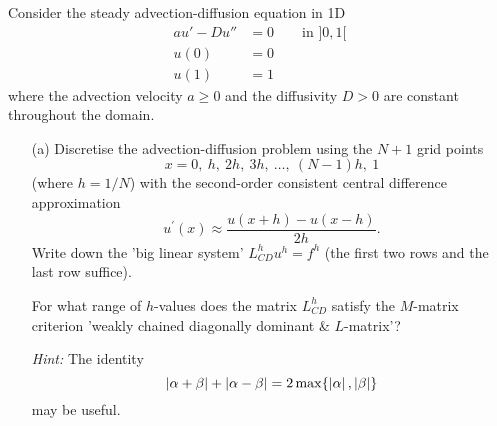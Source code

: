 




\begin{titlingpage}
	\titleGM
\end{titlingpage}
\clearpage
\setcounter{page}{1}

\begin{problem}{1}
Consider the steady advection-diffusion equation in 1D
%
\begin{align*}
    a u' - D u'' &= 0 \qquad
    \text{in } ]0,1[\\
    u(0) &= 0 \\
    u(1) &= 1
\end{align*}
%
where the advection velocity $a \ge 0$ and the diffusivity 
$D>0$ are constant throughout the domain.

\begin{itemize}
	\item[(a)] Discretise the advection-diffusion problem
	using the $N+1$ grid points
	$$x=0,\:h,\:2h,\:3h,\:\ldots,\:(N-1)h,\:1$$
	(where $h=1/N$) with the second-order consistent central 
	difference approximation
	$$u^\prime(x)\approx\frac{u(x+h)-u(x-h)}{2h}.$$
	Write down the 'big linear system' $L^h_{CD}u^h=f^h$
	(the first two rows and the last row suffice).
	
	For what range of $h$-values does the matrix $L^h_{CD}$
	satisfy the $M$-matrix criterion 'weakly chained
	diagonally dominant \& $L$-matrix'?
	
	\textit{Hint:} The identity
	$$\left| \alpha + \beta \right| + \left| \alpha - \beta \right| =
	2\max\{\left| \alpha \right|,\left| \beta \right|\}$$
	may be useful.         
\end{itemize}


\end{problem}
